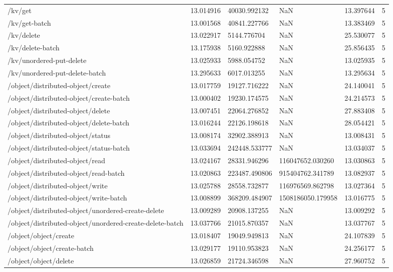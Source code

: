 \begin{tabularx}{\linewidth}{XXXXXX}
/kv/get & 13.014916 & 40030.992132 & NaN & 13.397644 & 5 \\
/kv/get-batch & 13.001568 & 40841.227766 & NaN & 13.383469 & 5 \\
/kv/delete & 13.022917 & 5144.776704 & NaN & 25.530077 & 5 \\
/kv/delete-batch & 13.175938 & 5160.922888 & NaN & 25.856435 & 5 \\
/kv/unordered-put-delete & 13.025933 & 5988.054752 & NaN & 13.025935 & 5 \\
/kv/unordered-put-delete-batch & 13.295633 & 6017.013255 & NaN & 13.295634 & 5 \\
/object/distributed-object/create & 13.017759 & 19127.716222 & NaN & 24.140041 & 5 \\
/object/distributed-object/create-batch & 13.000402 & 19230.174575 & NaN & 24.214573 & 5 \\
/object/distributed-object/delete & 13.007451 & 22064.276852 & NaN & 27.883408 & 5 \\
/object/distributed-object/delete-batch & 13.016244 & 22126.198618 & NaN & 28.054421 & 5 \\
/object/distributed-object/status & 13.008174 & 32902.388913 & NaN & 13.008431 & 5 \\
/object/distributed-object/status-batch & 13.033694 & 242448.533777 & NaN & 13.034037 & 5 \\
/object/distributed-object/read & 13.024167 & 28331.946296 & 116047652.030260 & 13.030863 & 5 \\
/object/distributed-object/read-batch & 13.020863 & 223487.490806 & 915404762.341789 & 13.082937 & 5 \\
/object/distributed-object/write & 13.025788 & 28558.732877 & 116976569.862798 & 13.027364 & 5 \\
/object/distributed-object/write-batch & 13.008899 & 368209.484907 & 1508186050.179958 & 13.016775 & 5 \\
/object/distributed-object/unordered-create-delete & 13.009289 & 20908.137255 & NaN & 13.009292 & 5 \\
/object/distributed-object/unordered-create-delete-batch & 13.037766 & 21015.870357 & NaN & 13.037767 & 5 \\
/object/object/create & 13.018407 & 19049.949813 & NaN & 24.107839 & 5 \\
/object/object/create-batch & 13.029177 & 19110.953823 & NaN & 24.256177 & 5 \\
/object/object/delete & 13.026859 & 21724.346598 & NaN & 27.960752 & 5 \\

\end{tabularx}
